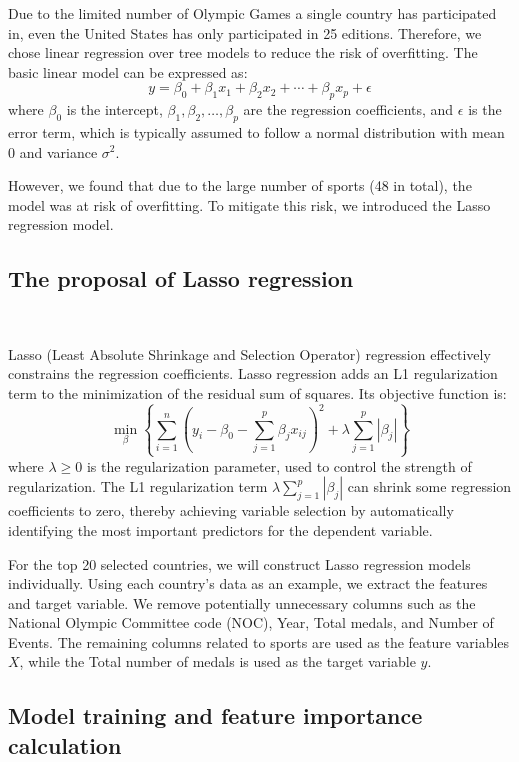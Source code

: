 \documentclass[12pt]{article}
\begin{document}
Due to the limited number of Olympic Games a single country has participated in, even the United States has only participated in 25 editions. Therefore, we chose linear regression over tree models to reduce the risk of overfitting. The basic linear model can be expressed as:
$$
y = \beta_0 + \beta_1 x_1 + \beta_2 x_2 + \cdots + \beta_p x_p + \epsilon
$$
where $\beta_0$ is the intercept, $\beta_1, \beta_2, \ldots, \beta_p$ are the regression coefficients, and $\epsilon$ is the error term, which is typically assumed to follow a normal distribution with mean 0 and variance $\sigma^2$.

However, we found that due to the large number of sports (48 in total), the model was at risk of overfitting. To mitigate this risk, we introduced the Lasso regression model.

\subsection{The proposal of Lasso regression} \

Lasso (Least Absolute Shrinkage and Selection Operator) regression effectively constrains the regression coefficients. Lasso regression adds an L1 regularization term to the minimization of the residual sum of squares. Its objective function is:
$$
\min_{\beta} \left\{ \sum_{i=1}^n \left( y_i - \beta_0 - \sum_{j=1}^p \beta_j x_{ij} \right)^2 + \lambda \sum_{j=1}^p |\beta_j| \right\}
$$
where $\lambda \geq 0$ is the regularization parameter, used to control the strength of regularization. The L1 regularization term $\lambda \sum_{j=1}^p |\beta_j|$ can shrink some regression coefficients to zero, thereby achieving variable selection by automatically identifying the most important predictors for the dependent variable.

For the top 20 selected countries, we will construct Lasso regression models individually. Using each country's data as an example, we extract the features and target variable. We remove potentially unnecessary columns such as the National Olympic Committee code (NOC), Year, Total medals, and Number of Events. The remaining columns related to sports are used as the feature variables $ X $, while the Total number of medals is used as the target variable $ y $.

\subsection{Model training and feature importance calculation}  \
\end{document}

